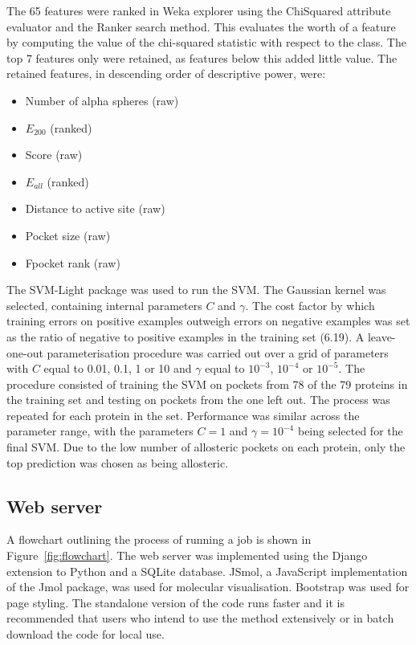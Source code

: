 The 65 features were ranked in Weka explorer \cite{Frank2004} using the ChiSquared attribute evaluator and the Ranker search method.
This evaluates the worth of a feature by computing the value of the chi-squared statistic with respect to the class.
The top 7 features only were retained, as features below this added little value.
The retained features, in descending order of descriptive power, were:
\begin{itemize}
\item Number of alpha spheres (raw)
\item $E_{200}$ (ranked)
\item Score (raw)
\item $E_{all}$ (ranked)
\item Distance to active site (raw)
\item Pocket size (raw)
\item Fpocket rank (raw)
\end{itemize}

The SVM-Light package \cite{Joachims1998} was used to run the SVM.
The Gaussian kernel was selected, containing internal parameters $C$ and $\gamma$.
The cost factor by which training errors on positive examples outweigh errors on negative examples was set as the ratio of negative to positive examples in the training set (6.19).
A leave-one-out parameterisation procedure was carried out over a grid of parameters with $C$ equal to 0.01, 0.1, 1 or 10 and $\gamma$ equal to $10^{-3}$, $10^{-4}$ or $10^{-5}$.
The procedure consisted of training the SVM on pockets from 78 of the 79 proteins in the training set and testing on pockets from the one left out.
The process was repeated for each protein in the set.
Performance was similar across the parameter range, with the parameters $C=1$ and $\gamma=10^{-4}$ being selected for the final SVM.
Due to the low number of allosteric pockets on each protein, only the top prediction was chosen as being allosteric.


\subsection{Web server}

A flowchart outlining the process of running a job is shown in Figure~\ref{fig:flowchart}.
The web server was implemented using the Django extension to Python and a SQLite database.
JSmol, a JavaScript implementation of the Jmol package, was used for molecular visualisation.
Bootstrap was used for page styling.
The standalone version of the code runs faster and it is recommended that users who intend to use the method extensively or in batch download the code for local use.


